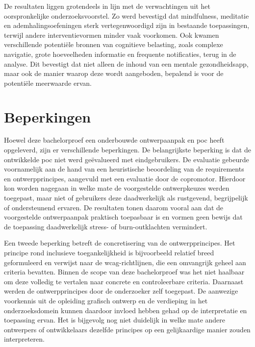 \vspace{1em}

De resultaten liggen grotendeels in lijn met de verwachtingen uit het oorspronkelijke onderzoeksvoorstel. Zo werd bevestigd dat mindfulness, meditatie en ademhalingsoefeningen sterk vertegenwoordigd zijn in bestaande toepassingen, terwijl andere interventievormen minder vaak voorkomen. Ook kwamen verschillende potentiële bronnen van cognitieve belasting, zoals complexe navigatie, grote hoeveelheden informatie en frequente notificaties, terug in de analyse. Dit bevestigt dat niet alleen de inhoud van een mentale gezondheidsapp, maar ook de manier waarop deze wordt aangeboden, bepalend is voor de potentiële meerwaarde ervan.

\vspace{1em}


\section{Beperkingen}
\label{sec:beperkingen}

\vspace{1em}

Hoewel deze bachelorproef een onderbouwde ontwerpaanpak en \acrlong{poc} heeft opgeleverd, zijn er verschillende beperkingen. De belangrijkste beperking is dat de ontwikkelde \acrshort{poc} niet werd geëvalueerd met eindgebruikers. De evaluatie gebeurde voornamelijk aan de hand van een heuristische beoordeling van de requirements en ontwerpprincipes, aangevuld met een evaluatie door de copromotor. Hierdoor kon worden nagegaan in welke mate de voorgestelde ontwerpkeuzes werden toegepast, maar niet of gebruikers deze daadwerkelijk als rustgevend, begrijpelijk of ondersteunend ervaren. De resultaten tonen daarom vooral aan dat de voorgestelde ontwerpaanpak praktisch toepasbaar is en vormen geen bewijs dat de toepassing daadwerkelijk stress- of burn-outklachten vermindert.

\vspace{1em}

Een tweede beperking betreft de concretisering van de ontwerpprincipes. Het principe rond inclusieve toegankelijkheid is bijvoorbeeld relatief breed geformuleerd en verwijst naar de \acrshort{wcag}-richtlijnen, die een omvangrijk geheel aan criteria bevatten. Binnen de scope van deze bachelorproef was het niet haalbaar om deze volledig te vertalen naar concrete en controleerbare criteria. Daarnaast werden de ontwerpprincipes door de onderzoeker zelf toegepast. De aanwezige voorkennis uit de opleiding grafisch ontwerp en de verdieping in het onderzoeksdomein kunnen daardoor invloed hebben gehad op de interpretatie en toepassing ervan. Het is bijgevolg nog niet duidelijk in welke mate andere ontwerpers of ontwikkelaars dezelfde principes op een gelijkaardige manier zouden interpreteren.

